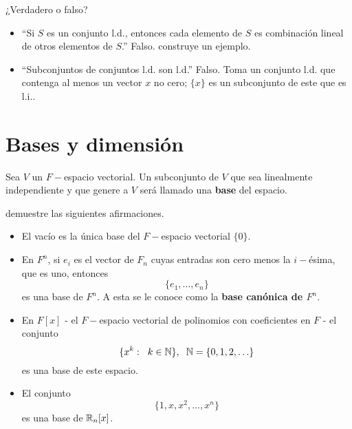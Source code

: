 \begin{ejem}
¿Verdadero o falso?
\begin{itemize}
	\item ``Si $S$ es un conjunto l.d., entonces cada
	elemento de $S$ es combinación lineal de otros elementos de 
	$S$.'' Falso.  construye un ejemplo. 
	\item ``Subconjuntos de conjuntos l.d. son l.d.'' Falso.
	Toma un conjunto l.d. que contenga al menos un vector 
	$x$ no cero; $\{ x \}$ es un subconjunto de este que es l.i..
\end{itemize}
\end{ejem}

\section{Bases y dimensión}

\begin{defi}
Sea $V$ un $F-$espacio vectorial. Un subconjunto de $V$
que sea linealmente independiente y que genere a $V$ será llamado
una \textbf{base} del espacio.
\end{defi}

\begin{ejem}
 demuestre las siguientes afirmaciones.
\begin{itemize}
	\item El vacío es la única base del $F-$espacio vectorial
	$\{ 0 \}$.
	\item En $F^{n}$, si $e_{i}$ es el vector de $F_{n}$ cuyas
	entradas son cero menos la $i-$ésima, que es uno, entonces
	\[
	\{ e_{1}, \ldots , e_{n} \}
	\] 
	es una base de $F^{n}$. A esta se le conoce como la
	\textbf{base canónica de $F^{n}$}.
	\item En $F[x]$ - el $F-$espacio vectorial de polinomios con 
	coeficientes en $F$ - el conjunto
	\[
	\{ x^{k} : \hspace{0.2cm} k \in \mathbb{N} \},
	\hspace{0.2cm} \mathbb{N} = \{ 0, 1, 2, \ldots \}
	\]
	es una base de este espacio.
	\item El conjunto
	\[
	\{1, x, x^{2}, \ldots , x^{n} \}
	\]
	es una base de $\mathbb{R}_{n}[x]$.
\end{itemize}
\end{ejem}


